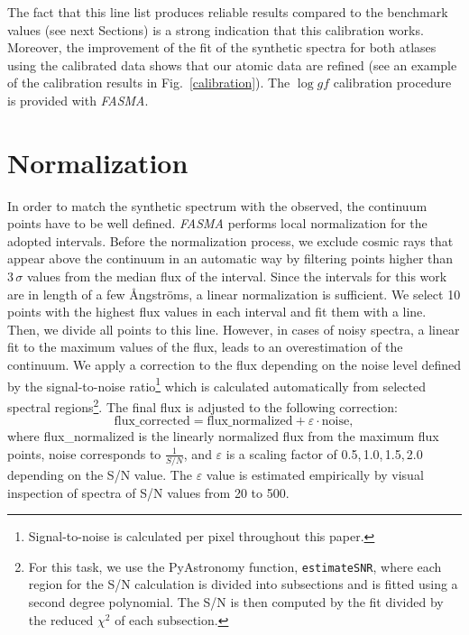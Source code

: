 \documentclass[fleqn,usenatbib]{mnras}
\begin{document}
The fact that this line list produces reliable results compared to the benchmark values (see next Sections) is a strong indication that this calibration works. Moreover, 
the improvement of the fit of the synthetic spectra for both atlases using the calibrated data shows that our atomic data are refined (see an example of the calibration results in 
Fig.~\ref{calibration}). The $\log gf$ calibration procedure is provided with \textit{FASMA}.

\section{Normalization}\label{normalization}

In order to match the synthetic spectrum with the observed, the continuum points have to be well defined. \textit{FASMA} performs local 
normalization for the adopted intervals. 
Before the normalization process, we exclude cosmic rays that appear above the continuum in an automatic way by filtering points higher than 3\,$\sigma$ values from the median flux of the 
interval. 
Since the intervals for this work are in length of a few \AA{}ngstr\"{o}ms, a linear normalization is sufficient. 
We select 10 points with the highest flux values in each interval and fit them with a line. 
Then, we divide all points to this line. However, in cases of noisy spectra, a linear fit to the 
maximum values of the flux, leads to an overestimation of the continuum. We apply a correction to the flux depending on the noise level defined by the signal-to-noise 
ratio\footnote{Signal-to-noise is calculated per pixel throughout this paper.} which is calculated automatically from selected spectral regions\footnote{For this task, we use the 
PyAstronomy function, \texttt{estimateSNR}, where each region for the S/N calculation is divided into subsections and is fitted using a second degree polynomial. 
The S/N is then computed by the fit divided by the reduced $\chi^{2}$ of each subsection.}. 
The final flux is adjusted to the following correction: 
\begin{equation}
 \mathrm{flux\_corrected} = \mathrm{flux\_normalized} + \varepsilon \cdot \mathrm{noise},  
\end{equation}
where flux\_$\mathrm{normalized}$ is the linearly normalized flux from the maximum flux points, noise corresponds to $\tfrac{1}{S/N}$, and $\varepsilon$ is a scaling factor of 0.5,\,1.0,\,1.5,\,2.0 
depending on the S/N value. The $\varepsilon$ value is estimated empirically by visual inspection of spectra of S/N values from 20 to 500.%
\end{document}
